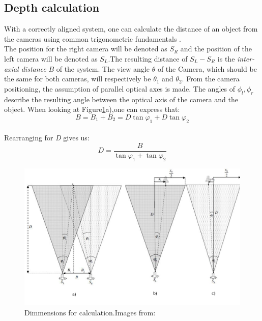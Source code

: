 \subsection{Depth calculation}
With a correctly aligned system, one can calculate the distance of an object from the cameras using common trigonometric fundamentals  \cite{JernejMrovlje.2008,YasirDawoodSalman.2017}.
\\
The position for the right camera will be denoted as $S_{R}$ and the position of the left camera will be denoted as $S_{L}$.The resulting distance of $S_{L}-S_{R}$ is the \textit{inter-axial distance} $B$ of the system. The view angle $\theta$ of the Camera, which should be the same for both cameras, will respectively be $\theta_{1}$ and $\theta_{2}$. From the camera positioning, the assumption of parallel optical axes is made. The angles of $\phi_{l},\phi_{r}$ describe the resulting angle between the optical axis of the camera and the object.
When looking at Figure\ref{stereo_Dimmensions}a),one can express that:\\
\begin{equation}
B= B_{1}+B_{2}=D\tan\varphi_{1}+D\tan\varphi_{2}
\end{equation}\\
Rearranging for \textit{D} gives us:\\
\begin{equation}
D = \frac{B}{\tan\varphi_{1}+\tan\varphi_{2}}
\end{equation}
\begin{figure}[H]
\includegraphics[width=\textwidth]{images/Stereo_Calc_4.JPG}
\caption{Dimmensions for calculation.Images from: \cite{JernejMrovlje.2008}}
\label{stereo_Dimmensions} 
\end{figure}
